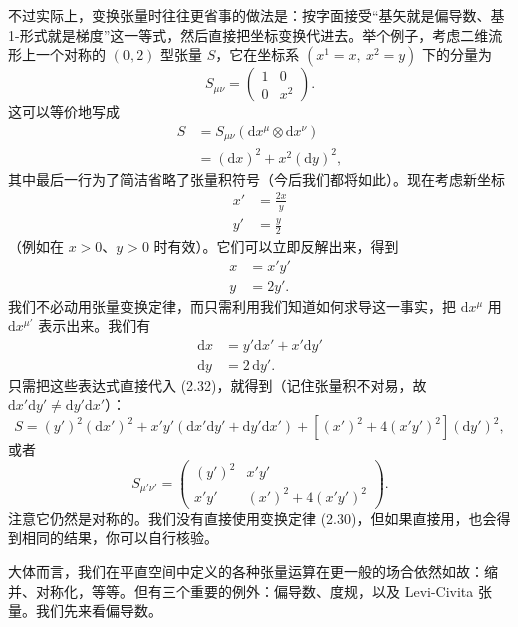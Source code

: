 不过实际上，变换张量时往往更省事的做法是：按字面接受“基矢就是偏导数、基 1-形式就是梯度”这一等式，然后直接把坐标变换代进去。举个例子，考虑二维流形上一个对称的 $(0,2)$ 型张量 $S$，它在坐标系 $(x^1=x,\ x^2=y)$ 下的分量为
\begin{equation*}
S_{\mu\nu}=\begin{pmatrix} 1 & 0 \\ 0 & x^2 \end{pmatrix}. \tag{2.31}
\end{equation*}
这可以等价地写成
\begin{align*}
S&=S_{\mu\nu}(\mathrm{d}x^\mu\otimes\mathrm{d}x^\nu)\\
&=(\mathrm{d}x)^2+x^2(\mathrm{d}y)^2, \tag{2.32}
\end{align*}
其中最后一行为了简洁省略了张量积符号（今后我们都将如此）。现在考虑新坐标
\begin{align*}
x'&=\frac{2x}{y}\\
y'&=\frac{y}{2} \tag{2.33}
\end{align*}
（例如在 $x>0$、$y>0$ 时有效）。它们可以立即反解出来，得到
\begin{align*}
x&=x'y'\\
y&=2y'. \tag{2.34}
\end{align*}
我们不必动用张量变换定律，而只需利用我们知道如何求导这一事实，把 $\mathrm{d}x^\mu$ 用 $\mathrm{d}x^{\mu'}$ 表示出来。我们有
\begin{align*}
\mathrm{d}x&=y'\mathrm{d}x'+x'\mathrm{d}y'\\
\mathrm{d}y&=2\,\mathrm{d}y'. \tag{2.35}
\end{align*}
只需把这些表达式直接代入 (2.32)，就得到（记住张量积不对易，故 $\mathrm{d}x'\mathrm{d}y'\neq\mathrm{d}y'\mathrm{d}x'$）：
\begin{equation*}
S=(y')^2(\mathrm{d}x')^2+x'y'\left(\mathrm{d}x'\mathrm{d}y'+\mathrm{d}y'\mathrm{d}x'\right)+\left[(x')^2+4(x'y')^2\right](\mathrm{d}y')^2, \tag{2.36}
\end{equation*}
或者
\begin{equation*}
S_{\mu'\nu'}=\begin{pmatrix} (y')^2 & x'y' \\ x'y' & (x')^2+4(x'y')^2 \end{pmatrix}. \tag{2.37}
\end{equation*}
注意它仍然是对称的。我们没有直接使用变换定律 (2.30)，但如果直接用，也会得到相同的结果，你可以自行核验。

大体而言，我们在平直空间中定义的各种张量运算在更一般的场合依然如故：缩并、对称化，等等。但有三个重要的例外：偏导数、度规，以及 Levi-Civita 张量。我们先来看偏导数。

